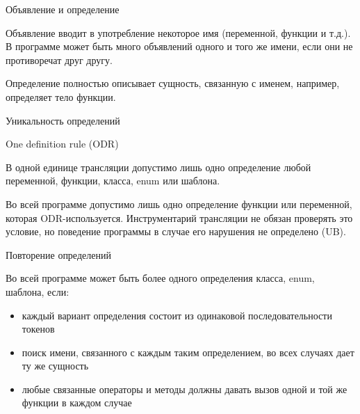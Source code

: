 \documentclass[unknownkeysallowed,xcolor=table]{beamer}
\begin{document}
\begin{frame}{Объявление и определение}

Объявление вводит в употребление некоторое имя (переменной, функции и т.д.). В программе может быть много объявлений одного и того же имени, если они не противоречат друг другу.

\vspace{3em}

Определение полностью описывает сущность, связанную с именем, например, определяет тело функции.

\end{frame}

\begin{frame}{Уникальность определений}

One definition rule (ODR)

\vspace{2em}

В одной единице трансляции допустимо лишь одно определение любой переменной, функции, класса, enum или шаблона.

\vspace{2em}

Во всей программе допустимо лишь одно определение функции или переменной, которая ODR-используется. Инструментарий трансляции не обязан проверять это условие, но поведение программы в случае его нарушения не определено (UB).

\end{frame}

\begin{frame}{Повторение определений}

Во всей программе может быть более одного определения класса, enum, шаблона, если:

\vspace{1em}

\begin{itemize}
  \item каждый вариант определения состоит из одинаковой последовательности токенов \vspace{1em}
  \item поиск имени, связанного с каждым таким определением, во всех случаях дает ту же сущность \vspace{1em}
  \item любые связанные операторы и методы должны давать вызов одной и той же функции в каждом случае
\end{itemize}

\end{frame}
\end{document}
